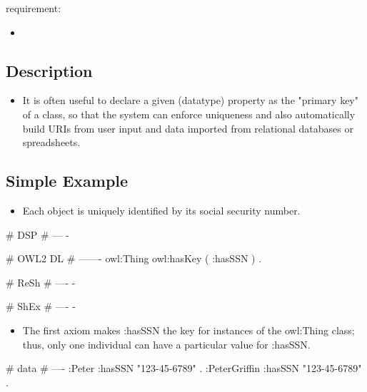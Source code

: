 \documentclass{llncs}
\begin{document}
requirement:

\begin{itemize}
	\item 
\end{itemize}

\subsection{Description}

\begin{itemize}
  \item It is often useful to declare a given (datatype) property as the "primary key" of a class, so that the system can enforce uniqueness and also automatically build URIs from user input and data imported from relational databases or spreadsheets. 
\end{itemize}

\subsection{Simple Example}

\begin{itemize}
	\item Each object is uniquely identified by its social security number.
\end{itemize}

\begin{ex}
# DSP
# ---
-
\end{ex}

\begin{ex}
# OWL2 DL
# -------
owl:Thing owl:hasKey ( :hasSSN ) . 	
\end{ex}

\begin{ex}
# ReSh
# ----
-
\end{ex}

\begin{ex}
# ShEx
# ----
-
\end{ex}

\begin{itemize}
	\item The first axiom makes :hasSSN the key for instances of the owl:Thing class; thus, only one individual can have a particular value for :hasSSN. 
\end{itemize}

\begin{ex}
# data
# ----
:Peter :hasSSN "123-45-6789" . 
:PeterGriffin :hasSSN "123-45-6789" . 
\end{ex}
\end{document}
